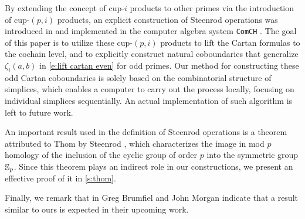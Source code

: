 By extending the concept of cup-$i$ products to other primes via the introduction of cup-$(p,i)$ products, an explicit construction of Steenrod operations was introduced in \cite{medina2021may_st} and implemented in the computer algebra system \texttt{ComCH} \cite{medina2021comch}.
The goal of this paper is to utilize these cup-$(p,i)$ products to lift the Cartan formulas to the cochain level, and to explicitly construct natural coboundaries that generalize $\zeta_i(a,b)$ in \cref{e:lift cartan even} for odd primes.
Our method for constructing these odd Cartan coboundaries is solely based on the combinatorial structure of simplices, which enables a computer to carry out the process locally, focusing on individual simplices sequentially.
An actual implementation of such algorithm is left to future work.

An important result used in the definition of Steenrod operations is a theorem attributed to Thom by Steenrod \cite{steenrod1953cyclic}, which characterizes the image in mod $p$ homology of the inclusion of the cyclic group of order $p$ into the symmetric group $\mathbb{S}_p$.
Since this theorem plays an indirect role in our constructions, we present an effective proof of it in \cref{s:thom}.

Finally, we remark that in \cite{brumfiel2023explicit} Greg Brumfiel and John Morgan indicate that a result similar to ours is expected in their upcoming work.